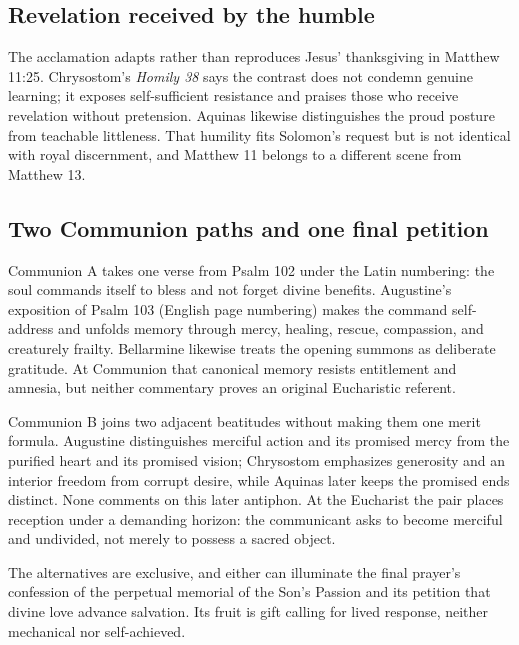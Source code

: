 \sectionguard
\subsection*{Revelation received by the humble\enspace{}}

The acclamation adapts rather than reproduces Jesus' thanksgiving in Matthew 11:25. Chrysostom's \emph{Homily 38} says the contrast does not condemn genuine learning; it exposes self-sufficient resistance and praises those who receive revelation without pretension. Aquinas likewise distinguishes the proud posture from teachable littleness. That humility fits Solomon's request but is not identical with royal discernment, and Matthew 11 belongs to a different scene from Matthew 13.

\sectionguard
\subsection*{Two Communion paths and one final petition\enspace{}}

Communion A takes one verse from Psalm 102 under the Latin numbering: the soul commands itself to bless and not forget divine benefits. Augustine's exposition of Psalm 103 (English page numbering) makes the command self-address and unfolds memory through mercy, healing, rescue, compassion, and creaturely frailty. Bellarmine likewise treats the opening summons as deliberate gratitude. At Communion that canonical memory resists entitlement and amnesia, but neither commentary proves an original Eucharistic referent.

Communion B joins two adjacent beatitudes without making them one merit formula. Augustine distinguishes merciful action and its promised mercy from the purified heart and its promised vision; Chrysostom emphasizes generosity and an interior freedom from corrupt desire, while Aquinas later keeps the promised ends distinct. None comments on this later antiphon. At the Eucharist the pair places reception under a demanding horizon: the communicant asks to become merciful and undivided, not merely to possess a sacred object.

The alternatives are exclusive, and either can illuminate the final prayer's confession of the perpetual memorial of the Son's Passion and its petition that divine love advance salvation. Its fruit is gift calling for lived response, neither mechanical nor self-achieved.
